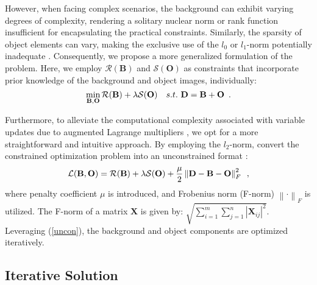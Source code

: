 \documentclass[10pt,journal,compsoc]{IEEEtran}
\begin{document}
However, when facing complex scenarios, the background can exhibit varying degrees of complexity, rendering a solitary nuclear norm or rank function insufficient for encapsulating the practical constraints. Similarly, the sparsity of object elements can vary, making the exclusive use of the $l_0$ or $l_1$-norm potentially inadequate \cite{zhang-2021-srws}. Consequently, we propose a more generalized formulation of the problem. Here, we employ $\mathcal{R}(\mathbf{B})$ and $\mathcal{S}(\mathbf{O})$ as constraints that incorporate prior knowledge of the background and object images, individually:
\begin{equation}
\setlength{\abovedisplayskip}{2pt}
\setlength{\belowdisplayskip}{1pt}
    \min \limits_{\mathbf{B},\mathbf{O}} \mathcal{R}(\mathbf{B}) + \lambda \mathcal{S}(\mathbf{O}) \quad s.t.~\mathbf{D} = \mathbf{B} + \mathbf{O} \enspace.
\label{eq_relaxPCP}
\end{equation}

Furthermore, to alleviate the computational complexity associated with variable updates due to augmented Lagrange multipliers \cite{dai-2017-ript}, we opt for a more straightforward and intuitive approach. By employing the $l_2$-norm, convert the constrained optimization problem into an unconstrained format \cite{tseng-2008-convex}:
\begin{equation}
\setlength{\abovedisplayskip}{2pt}
\setlength{\belowdisplayskip}{2pt}
    \mathcal{L}(\mathbf{B},\mathbf{O}) = \mathcal{R}(\mathbf{B}) + \lambda \mathcal{S}(\mathbf{O}) + \frac{\mu}{2} \left\| \mathbf{D} - \mathbf{B} - \mathbf{O} \right\|^2_F \enspace,
\label{uncon}
\end{equation}
where penalty coefficient $\mu$ is introduced, and Frobenius norm (F-norm) ${\left\| \cdot \right\|_F}$ is utilized. 
The F-norm of a matrix $\mathbf{X}$ is given by: $\sqrt {\sum\limits_{i = 1}^m {\sum\limits_{j = 1}^n {{{\left| {{\mathbf{X}_{ij}}} \right|}^2}}}}$. 
Leveraging (\ref{uncon}), the background and object components are optimized iteratively.
\subsection{Iterative Solution}
\label{section:3.2}
\end{document}
